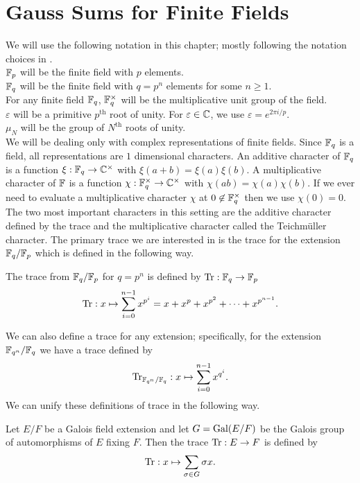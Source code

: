 \section{Gauss Sums for Finite Fields}
\noindent We will use the following notation in this chapter; mostly following the notation choices in \cite{Lang1990}.\\
$\mathbb{F}_p$ will be the finite field with $p$ elements.\\
$\mathbb{F}_q$ will be the finite field with $q = p^n$ elements for some $n \geq 1$.\\
For any finite field $\mathbb{F}_q$, $\mathbb{F}_q^\times$ will be the multiplicative unit group of the field.\\
$\varepsilon$ will be a primitive $p^\text{th}$ root of unity. For $\varepsilon \in \mathbb{C}$, we use $\varepsilon = e^{2 \pi i /p}$.\\
$\mu_N$ will be the group of $N^\text{th}$ roots of unity.\\

We will be dealing only with complex representations of finite fields.
Since $\mathbb{F}_q$ is a field, all representations are $1$ dimensional characters.
An additive character of $\mathbb{F}_q$ is a function $\xi : \mathbb{F}_q \to \mathbb{C}^\times$ with $\xi(a + b) = \xi(a)\xi(b)$.
A multiplicative character of $\mathbb{F}$ is a function $\chi : \mathbb{F}_q^\times \to \mathbb{C}^\times$ with $\chi(ab) = \chi(a)\chi(b)$.
If we ever need to evaluate a multiplicative character $\chi$ at $0 \not \in \mathbb{F}_q^\times$ then we use $\chi(0) = 0$. \\

The two most important characters in this setting are the additive character defined by the trace and the multiplicative character called the Teichm\"uller character. 
The primary trace we are interested in is the trace for the extension $\mathbb{F}_q / \mathbb{F}_p$ which is defined in the following way.
\begin{defn}
The trace from $\mathbb{F}_q / \mathbb{F}_p$ for $q = p^n$ is defined by $\textrm{Tr} : \mathbb{F}_q \to \mathbb{F}_p$
 \[ \textrm{Tr} : x \mapsto \sum_{i=0}^{n-1} x^{p^i} = x + x^p + x^{p^2} + \cdots + x^{p^{n-1}}.\]
\end{defn}
We can also define a trace for any extension; specifically, for the extension $\mathbb{F}_{q^n}/\mathbb{F}_q$ we have a trace defined by \[\textrm{Tr}_{\mathbb{F}_{q^n}/\mathbb{F}_q} : x \mapsto \sum_{i=0}^{n-1} x^{q^i}.\] 
We can unify these definitions of trace in the following way.
\begin{defn}
Let $E/F$ be a Galois field extension and let $G = \textrm{Gal}(E/F)$ be the Galois group of automorphisms of $E$ fixing $F$. 
Then the trace $\textrm{Tr} : E \to F$ is defined by \[\textrm{Tr} : x \mapsto \sum_{\sigma \in G} \sigma x.\]
\end{defn}

